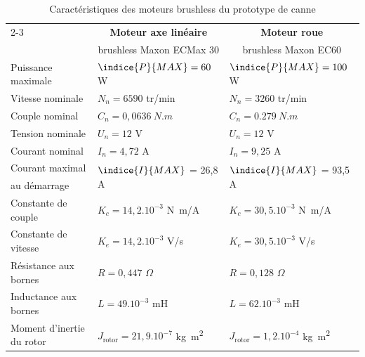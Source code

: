 \begin{table}[!ht]
\centering
\begin{footnotesize}
\begin{tabular}{|l|l|l|}
  \cline{2-3}
  \multicolumn{1}{c|}{} & \multicolumn{1}{|c|}{\textbf{Moteur axe linéaire}} & \multicolumn{1}{|c|}{\textbf{Moteur roue}}  \\ 
  \multicolumn{1}{c|}{} & \multicolumn{1}{|c|}{brushless Maxon ECMax 30} & \multicolumn{1}{|c|}{brushless Maxon EC60} \\
  \hline
  Puissance maximale & $\indice{P}{MAX} = 60$ W & $\indice{P}{MAX} = 100$ W \\ 
  
  Vitesse nominale & $N_n = \num{6590}$ tr/min & $N_n = \num{3260}$ tr/min \\ 
  
  Couple nominal & $C_n = {0,0636}\ \si{N.m}$ & $C_n = \SI{0,279}{N.m}$ \\ 
  
  Tension nominale & $U_n = 12$ V & $U_n = 12$ V \\ 
  
  Courant nominal & $I_n = 4,72$ A & $I_n = 9,25$ A \\ 
  
  Courant maximal & \multirow{2}{*}{$\indice{I}{MAX}$ = 26,8 A} &   \multirow{2}{*}{$\indice{I}{MAX}$ = 93,5 A} \\ 
  
  \hspace*{1.5cm} au démarrage &  &  \\ 
  
  Constante de couple & $K_c = 14,2.10^{-3}$ \si{N.m/A} & $K_c = 30,5.10^{-3}$ \si{N.m/A} \\
  
  Constante de vitesse & $K_e = 14,2.10^{-3}$ V/s & $K_e = 30,5.10^{-3}$ V/s \\ 

  Résistance aux bornes & $R = 0,447$ $\Omega$ & $R = 0,128$ $\Omega$ \\
  
  Inductance aux bornes & $L = 49 . 10^{-3}$ mH &  $L = 62 . 10^{-3}$ mH \\
  
  Moment d'inertie du rotor & $J_{\text{rotor}} = 21,9 . 10^{-7}$ \si{kg.m^2} & $J_{\text{rotor}} = 1,2 . 10^{-4}$ \si{kg.m^2} \\
  \hline  
\end{tabular} 
\caption{{ Caractéristiques des moteurs brushless du prototype de canne}}
\label{tab:donne_moteurs}
\end{footnotesize}
\end{table}

